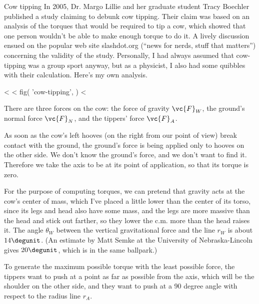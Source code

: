 \begin{eg}{Cow tipping}\label{eg:cow-tipping}
In 2005, Dr. Margo Lillie and her graduate student Tracy Boechler
published a study claiming to debunk cow tipping. Their claim
was based on an analysis of the torques that would be required
to tip a cow, which showed that one person wouldn't be able to
make enough torque to do it. A lively discussion ensued on the
popular web site slashdot.org (``news for nerds, stuff that
matters'') concerning the validity of the study. Personally, I
had always assumed that cow-tipping was a group sport anyway,
but as a physicist, I also had some quibbles with their calculation.
Here's my own analysis.

<%
<%
  fig(
    'cow-tipping',
  )
<%

There are three forces on the cow: the force of gravity $\vc{F}_W$, 
the ground's normal force $\vc{F}_N$, and the tippers' force $\vc{F}_A$.

As soon as the cow's left hooves (on the right from
our point of view) break contact with
the ground, the ground's force is being applied only to hooves on the other side.
We don't know the ground's force, and we don't want to find it. Therefore
we take the axis to be at its point of application, so that its torque
is zero.

For the purpose of computing torques, we can pretend that gravity acts at
the cow's center of mass, which I've placed a little lower than the center of
its torso, since its legs and head also have some mass, and the legs are more
massive than the head and stick out farther, so they lower the c.m. more than
the head raises it. The angle $\theta_W$ between the vertical gravitational force and
the line $r_{W}$ is about $14\degunit$. (An estimate by Matt Semke at 
the University of Nebraska-Lincoln gives $20\degunit$, which is in the same ballpark.)

To generate the maximum possible torque with the least possible force,
the tippers want to push at a point as far as possible from the axis, which will
be the shoulder on the other side, and they want to push at a 90 degree angle
with respect to the radius line $r_{A}$.


\end{eg}
